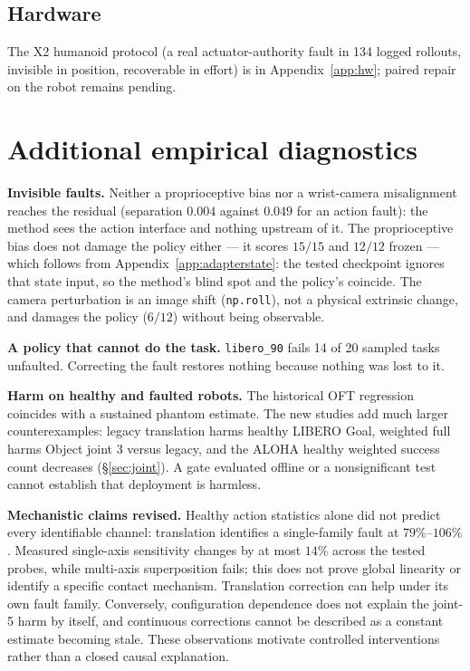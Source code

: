 \documentclass{article}
\newcommand{\code}[1]{\texttt{\small #1}}
\begin{document}
\subsection{Hardware}
\label{sec:hardware}
The X2 humanoid protocol (a real actuator-authority fault in 134 logged rollouts, invisible in position, recoverable in effort) is in Appendix~\ref{app:hw}; paired repair on the robot remains pending.

\section{Additional empirical diagnostics}
\label{sec:fail}

\textbf{Invisible faults.} Neither a proprioceptive bias nor a wrist-camera misalignment
reaches the residual (separation $0.004$ against $0.049$ for an action fault): the method
sees the action interface and nothing upstream of it. The proprioceptive bias does not
damage the policy either --- it scores $15/15$ and $12/12$ frozen --- which follows from
Appendix~\ref{app:adapterstate}: the tested checkpoint ignores that state input, so the method's blind
spot and the policy's coincide. The camera perturbation is an image shift (\code{np.roll}),
not a physical extrinsic change, and damages the policy ($6/12$) without being observable.

\textbf{A policy that cannot do the task.} \code{libero\_90} fails 14 of 20 sampled tasks
unfaulted. Correcting the fault restores nothing because nothing was lost to it.

\textbf{Harm on healthy and faulted robots.} The historical OFT regression coincides with a
sustained phantom estimate. The new studies add much larger counterexamples: legacy
translation harms healthy LIBERO Goal, weighted full harms Object joint 3 versus legacy,
and the ALOHA healthy weighted success count decreases (\S\ref{sec:joint}). A gate evaluated
offline or a nonsignificant test cannot establish that deployment is harmless.

\textbf{Mechanistic claims revised.} Healthy action statistics alone did not predict every
identifiable channel: translation identifies a single-family fault at $79\%$--$106\%$.
Measured single-axis sensitivity changes by at most $14\%$ across the tested probes, while
multi-axis superposition fails; this does not prove global linearity or identify a specific
contact mechanism. Translation correction can help under its own fault family. Conversely,
configuration dependence does not explain the joint-5 harm by itself, and continuous
corrections cannot be described as a constant estimate becoming stale. These observations
motivate controlled interventions rather than a closed causal explanation.
\end{document}
